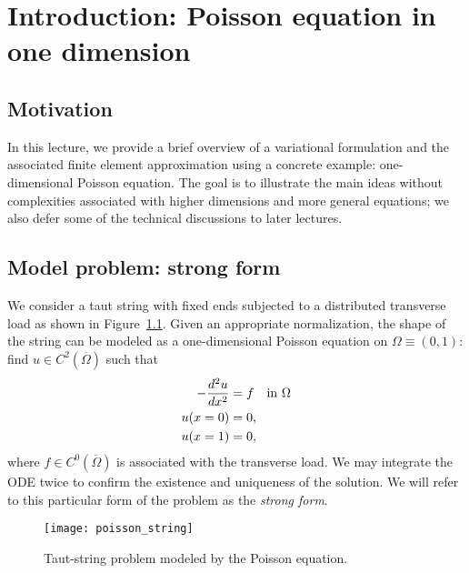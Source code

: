 \chapter{Introduction: Poisson equation in one dimension}

\disclaimer

\section{Motivation}
In this lecture, we provide a brief overview of a variational formulation and the associated finite element approximation using a concrete example: one-dimensional Poisson equation. The goal is to illustrate the main ideas without complexities associated with higher dimensions and more general equations; we also defer some of the technical discussions to later lectures.

\section{Model problem: strong form}
\label{sec:intro_strong}
We consider a taut string with fixed ends subjected to a distributed transverse load as shown in Figure~\ref{fig:intro_string}.  Given an appropriate normalization, the shape of the string can be modeled as a one-dimensional Poisson equation on $\Omega \equiv (0,1)$: find $u \in C^2(\overline \Omega)$ such that
\begin{align}
  - \frac{d ^2u}{d x^2} &= f \quad \text{in } \Omega  \label{eq:intro_strong} \\
  u(x=0) &= 0 \notag , \\
  u(x=1) &= 0 \notag ,
\end{align}
where $f \in C^0(\overline \Omega)$ is associated with the transverse load.  We may integrate the ODE twice to confirm the existence and uniqueness of the solution.  We will refer to this particular form of the problem as the \emph{strong form}.

\begin{figure}
  \centering
  \texttt{[image: poisson\_string]}
  \caption{Taut-string problem modeled by the Poisson equation. \label{fig:intro_string}}
\end{figure}


